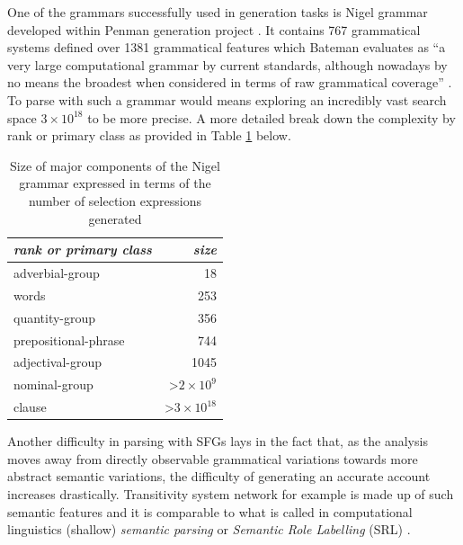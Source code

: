 One of the grammars successfully used in generation tasks is Nigel grammar developed within Penman generation project \citep{Mann83}. It contains 767 grammatical systems defined over 1381 grammatical features which Bateman evaluates as ``a very large computational grammar by current standards, although nowadays by no means the broadest when considered in terms of raw grammatical coverage'' \citep[29]{Bateman2008}. To parse with such a grammar would means exploring an incredibly vast search space $ 3 \times 10^{18} $ to be more precise. A more detailed break down the complexity by rank or primary class as provided in Table \ref{tab:size} below.

\begin{table}[!ht]
    \centering
    \begin{tabular}{|l|r|}
        \hline
        \textit{rank or primary class} & \textit{size}                             \\ \hline
        adverbial-group                & 18                                        \\ \hline
        words                          & 253                                       \\ \hline
        quantity-group                 & 356                                       \\ \hline
        prepositional-phrase           & 744                                       \\ \hline
        adjectival-group               & 1045                                      \\ \hline
        nominal-group                  & \textgreater $ 2\times 10^{9} $  \\ \hline
        clause                         & \textgreater $ 3\times 10^{18} $ \\ \hline
    \end{tabular}
    \caption{Size of major components of the Nigel grammar expressed in terms of the number of selection expressions generated \citep[35]{Bateman2008}}
    \label{tab:size}
\end{table}

Another difficulty in parsing with SFGs lays in the fact that, as the analysis moves away from directly observable grammatical variations towards more abstract semantic variations, the difficulty of generating an accurate account increases drastically. Transitivity system network for example is made up of such semantic features and it is comparable to what is called in computational linguistics (shallow) \textit{semantic parsing} or \textit{Semantic Role Labelling} (SRL) \citep{Carreras2005}.

